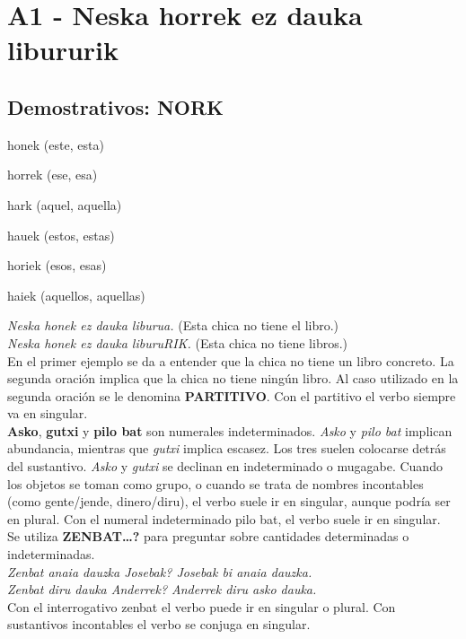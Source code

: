 \documentclass[11pt, a4paper]{article}
\begin{document}
\section{A1 - Neska horrek ez dauka libururik}
\subsection{Demostrativos: NORK}
\begin{itemize}
\begin{multicols}{2}
\item honek (este, esta)
\item horrek (ese, esa)
\item hark (aquel, aquella)
\item hauek (estos, estas)
\item horiek (esos, esas)
\item haiek (aquellos, aquellas)
\end{multicols}
\end{itemize}

\textit{Neska honek ez dauka liburua.} (Esta chica no tiene el libro.)\\
\indent \textit{Neska honek ez dauka liburuRIK.} (Esta chica no tiene libros.)\\
\noindent En el primer ejemplo se da a entender que la chica no tiene un libro concreto. La segunda oración implica que la chica no tiene ningún libro. Al caso utilizado en la segunda oración se le denomina \textbf{PARTITIVO}. Con el partitivo el verbo siempre va en singular.\\

\noindent \textbf{Asko}, \textbf{gutxi} y \textbf{pilo bat} son numerales indeterminados. \textit{Asko} y \textit{pilo bat} implican abundancia, mientras que \textit{gutxi} implica escasez. Los tres suelen colocarse detrás del sustantivo. \textit{Asko} y \textit{gutxi} se declinan en indeterminado o mugagabe. Cuando los objetos se toman como grupo, o cuando se trata de nombres incontables (como gente/jende, dinero/diru), el verbo suele ir en singular, aunque podr\'ia ser en plural.   Con el numeral indeterminado pilo bat, el verbo suele ir en singular.\\

\noindent Se utiliza \textbf{ZENBAT…?} para preguntar sobre cantidades determinadas o indeterminadas.\\
\indent \textit{Zenbat anaia dauzka Josebak? Josebak bi anaia dauzka.}\\
\indent \textit{Zenbat diru dauka Anderrek? Anderrek diru asko dauka.}\\
\noindent Con el interrogativo zenbat el verbo puede ir en singular o plural. Con sustantivos incontables el verbo se conjuga en singular.
\end{document}
